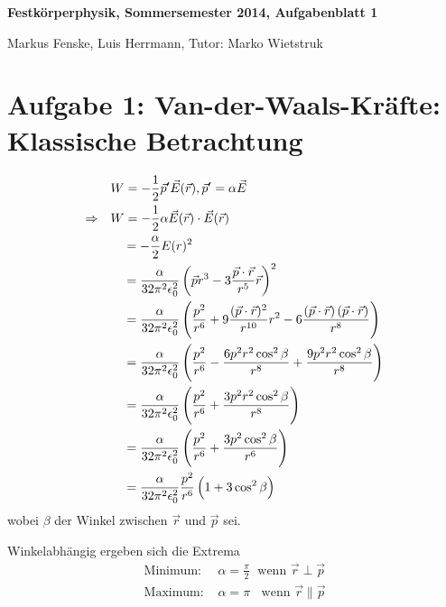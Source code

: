 \documentclass[a4paper,german,12pt,smallheadings]{scrartcl}
\begin{document}
\allowdisplaybreaks %
\begin{center}
\bfseries %
\sffamily %
\vspace{-40pt}
Festkörperphysik, Sommersemester 2014, Aufgabenblatt 1

Markus Fenske, Luis Herrmann, Tutor: Marko Wietstruk
\vspace{-10pt}
\end{center}
\section*{Aufgabe 1: Van-der-Waals-Kräfte: Klassische Betrachtung}
\begin{align}
  &W = -\frac{1}{2} \vec{p}' \vec{E}(\vec{r}), \vec{p}' = \alpha \vec{E} \\
  \Rightarrow \quad &W = - \frac{1}{2} \alpha \vec{E}(\vec{r}) \cdot \vec{E}(\vec{r}) \\
                    &\;\;\;\, = - \frac{\alpha}{2} E(r)^2 \\
  &\;\;\;\,
  = \frac{\alpha}{32 \pi^2 \epsilon_0^2} \del{
    \vec{p}{r^3} - 3 \frac{\vec{p} \cdot \vec{r}}{r^5} \vec{r}
  }^2 \\
  &\;\;\;\,
  = \frac{\alpha}{32 \pi^2 \epsilon_0^2} \del{
    \frac{p^2}{r^6} + 9 \frac{(\vec{p} \cdot \vec{r})^2}{r^{10}} r^2
    - 6 \frac{\del{\vec{p} \cdot \vec{r}} \del{\vec{p} \cdot \vec{r}}}{r^8}
  } \\
  &\;\;\;\,
  = \frac{\alpha}{32 \pi^2 \epsilon_0^2} \del{
    \frac{p^2}{r^6} - \frac{6p^2r^2 \cos^2 \beta}{r^8} + \frac{9 p^2 r^2 \cos^2 \beta}{r^8}
  } \\
  &\;\;\;\,
  = \frac{\alpha}{32 \pi^2 \epsilon_0^2} \del{
    \frac{p^2}{r^6} + \frac{3p^2r^2 \cos^2 \beta}{r^8}
  } \\
  &\;\;\;\,
  = \frac{\alpha}{32 \pi^2 \epsilon_0^2} \del{
    \frac{p^2}{r^6} + \frac{3p^2 \cos^2 \beta}{r^6}
  } \\
  &\;\;\;\,
  = \frac{\alpha}{32 \pi^2 \epsilon_0^2} \frac{p^2}{r^6} \del{
    1 + 3 \cos^2 \beta
  } \\
\end{align}
wobei $\beta$ der Winkel zwischen $\vec{r}$ und $\vec{p}$ sei.

Winkelabhängig ergeben sich die Extrema
\begin{align}
  \text{Minimum: } & \alpha = \frac{\pi}{2} \; \text{ wenn } \vec{r} \perp \vec{p} \\
  \text{Maximum: } & \alpha = \pi \;\; \text{ wenn } \vec{r} \parallel \vec{p} \\
\end{align}
\end{document}
